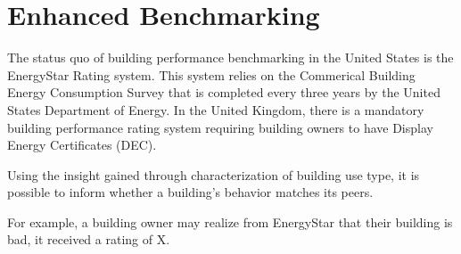 \section{Enhanced Benchmarking}
\label{sec:results_benchmarking}

The status quo of building performance benchmarking in the United States is the EnergyStar Rating system. This system relies on the Commerical Building Energy Consumption Survey that is completed every three years by the United States Department of Energy. In the United Kingdom, there is a mandatory building performance rating system requiring building owners to have Display Energy Certificates (DEC).

Using the insight gained through characterization of building use type, it is possible to inform whether a building's behavior matches its peers.

For example, a building owner may realize from EnergyStar that their building is bad, it received a rating of X.

